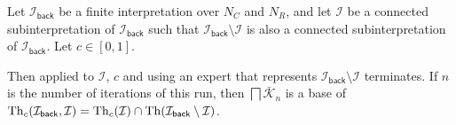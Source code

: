\begin{Theorem}
  \label{thm:model-exploration-by-confidence}
  Let $\mathcal{I}_{\mathsf{back}}$ be a finite interpretation over $N_{C}$ and $N_{R}$,
  and let $\mathcal{I}$ be a connected subinterpretation of $\mathcal{I}_{\mathsf{back}}$
  such that $\mathcal{I}_{\mathsf{back}} \setminus \mathcal{I}$ is also a connected
  subinterpretation of $\mathcal{I}_{\mathsf{back}}$.  Let $c \in [0,1]$.

  Then  applied to $\mathcal{I}$, $c$ and using
  an expert that represents $\mathcal{I}_{\mathsf{back}} \setminus \mathcal{I}$
  terminates.  If $n$ is the number of iterations of this run, then $\bigsqcap
  \bar{\mathcal{K}}_{n}$ is a base of $\operatorname{Th}_{c}(\mathcal{I}_{\mathsf{back}}, \mathcal{I}) =
  \operatorname{Th}_{c}(\mathcal{I}) \cap \operatorname{Th}(\mathcal{I}_{\mathsf{back}} \setminus \mathcal{I})$.
\end{Theorem}
